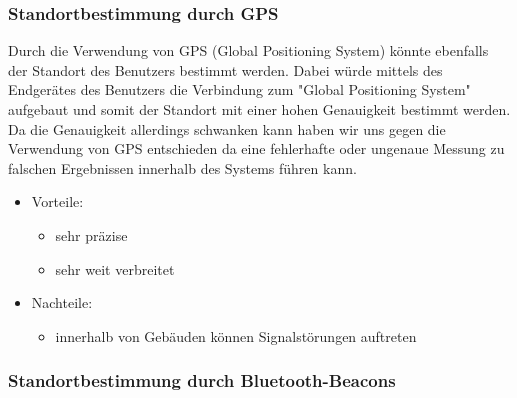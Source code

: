 \subsubsection{Standortbestimmung durch GPS}
\label{sec:Standortbestimmung_durch_GPS}

Durch die Verwendung von GPS (Global Positioning System) könnte ebenfalls der
Standort des Benutzers bestimmt werden. Dabei würde mittels des Endgerätes des
Benutzers die Verbindung
zum "Global Positioning System" aufgebaut und somit der Standort mit einer hohen
Genauigkeit bestimmt werden. Da die Genauigkeit allerdings schwanken kann haben
wir uns gegen die Verwendung von GPS entschieden da eine fehlerhafte oder
ungenaue Messung zu falschen Ergebnissen innerhalb des Systems führen kann.

\begin{itemize}
	\item Vorteile:
	\begin{itemize}
		\item sehr präzise
		\item sehr weit verbreitet
	\end{itemize}
	\item Nachteile:
	\begin{itemize}
		\item innerhalb von Gebäuden können Signalstörungen auftreten
	\end{itemize}
\end{itemize}

\subsubsection{Standortbestimmung durch Bluetooth-Beacons}
\label{sec:Standortbestimmung_durch_Bluetooth-Beacons}

